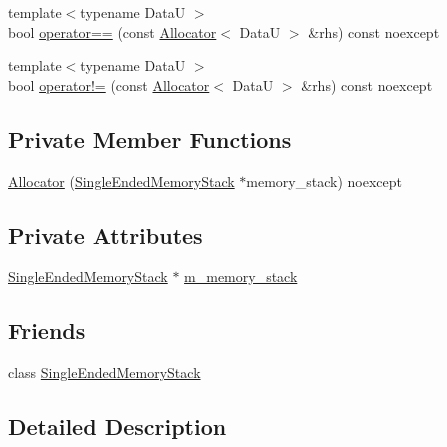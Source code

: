 \begin{DoxyCompactItemize}
\item 
{\footnotesize template$<$typename DataU $>$ }\\bool \hyperlink{classmage_1_1_single_ended_memory_stack_1_1_allocator_a47f5e7baf66ddebc8aec402c6a9f1eef}{operator==} (const \hyperlink{classmage_1_1_single_ended_memory_stack_1_1_allocator}{Allocator}$<$ DataU $>$ \&rhs) const noexcept
\item 
{\footnotesize template$<$typename DataU $>$ }\\bool \hyperlink{classmage_1_1_single_ended_memory_stack_1_1_allocator_ae8b77280f1f31e30cb1536f8ecae08c9}{operator!=} (const \hyperlink{classmage_1_1_single_ended_memory_stack_1_1_allocator}{Allocator}$<$ DataU $>$ \&rhs) const noexcept
\end{DoxyCompactItemize}
\subsection*{Private Member Functions}
\begin{DoxyCompactItemize}
\item 
\hyperlink{classmage_1_1_single_ended_memory_stack_1_1_allocator_a991173b1fccf74994dc9298b3cffb795}{Allocator} (\hyperlink{classmage_1_1_single_ended_memory_stack}{Single\+Ended\+Memory\+Stack} $\ast$memory\+\_\+stack) noexcept
\end{DoxyCompactItemize}
\subsection*{Private Attributes}
\begin{DoxyCompactItemize}
\item 
\hyperlink{classmage_1_1_single_ended_memory_stack}{Single\+Ended\+Memory\+Stack} $\ast$ \hyperlink{classmage_1_1_single_ended_memory_stack_1_1_allocator_ac5d79f87385234430d25cdf004255d70}{m\+\_\+memory\+\_\+stack}
\end{DoxyCompactItemize}
\subsection*{Friends}
\begin{DoxyCompactItemize}
\item 
class \hyperlink{classmage_1_1_single_ended_memory_stack_1_1_allocator_a3f3449e5c2caa1666a293b36db6f5a54}{Single\+Ended\+Memory\+Stack}
\end{DoxyCompactItemize}


\subsection{Detailed Description}
